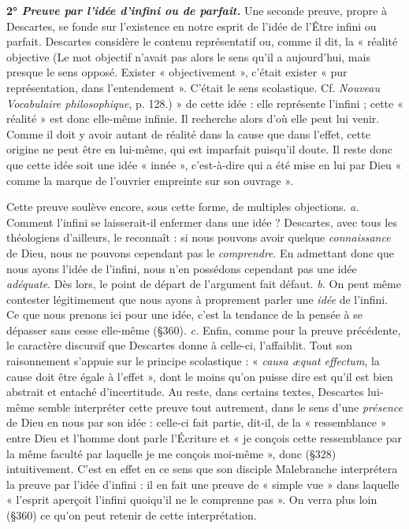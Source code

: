 {\textbf{2° \textit {\textsf{Preuve par l'idée d'infini ou de parfait.}}}
Une seconde preuve, propre à
Descartes, se fonde sur l'existence en notre esprit de l’idée de l'Être
infini ou parfait. Descartes considère le contenu représentatif ou, comme
il dit, la « réalité objective
{\scriptsize (Le mot {\it }objectif n'avait pas alors le sens qu'il a aujourd’hui, mais presque le sens
opposé. Exister « objectivement », c'était exister « pur représentation, dans l'entendement ».
C'était le sens scolastique. Cf. {\it Nouveau Vocabulaire philosophique}, p. 128.)}
» de cette idée : elle représente l’infini ; cette
« réalité » est donc elle-même infinie. Il recherche alors d'où elle peut lui
venir. Comme il doit y avoir autant de réalité dans la cause que dans l'effet,
cette origine ne peut être en lui-même, qui est imparfait puisqu'il doute.
Il reste donc que cette idée soit une idée « innée », c’est-à-dire qui a été mise
en lui par Dieu « comme la marque de l’ouvrier empreinte sur son ouvrage ».

Cette preuve soulève encore, sous cette forme, de multiples objections.
{\it a.} Comment l'infini se laisserait-il enfermer dans une idée ? Descartes, avec
tous les théologiens d’ailleurs, le reconnaît : si nous pouvons avoir quelque
{\it connaissance} de Dieu, nous ne pouvons cependant pas le {\it comprendre}.
En admettant donc que nous ayons l’idée de l'infini, nous n’en possédons
cependant pas une idée {\it adéquate}. Dès lors, le point de départ de l’argument
fait défaut. {\it b.} On peut même contester légitimement que nous
ayons à proprement parler une {\it idée} de l'infini. Ce que nous prenons ici
pour une idée, c’est la tendance de la pensée à se dépasser sans cesse elle-même
(\S 360). {\it c.} Enfin, comme pour la preuve précédente, le caractère discursif
que Descartes donne à celle-ci, l’affaiblit. Tout son raisonnement
s'appuie sur le principe scolastique : « {\it causa æquat effectum}, la cause doit
être égale à l’effet », dont le moins qu’on puisse dire est qu’il est bien abstrait
et entaché d'incertitude. Au reste, dans certains textes, Descartes lui-même
semble interpréter cette preuve tout autrement, dans le sens d’une {\it présence}
de Dieu en nous par son idée : celle-ci fait partie, dit-il, de la « ressemblance »
entre Dieu et l’homme dont parle l'Écriture et « je conçois cette
ressemblance par la même faculté par laquelle je me conçois moi-même »,
donc (\S 328) intuitivement. C’est en effet en ce sens que son disciple Malebranche
interprétera la preuve par l’idée d’infini : il en fait une preuve
de « simple vue » dans laquelle « l'esprit aperçoit l'infini quoiqu'il ne le
comprenne pas ». On verra plus loin (\S 360) ce qu’on peut retenir de cette
interprétation.}
\vspace{0.31cm}

